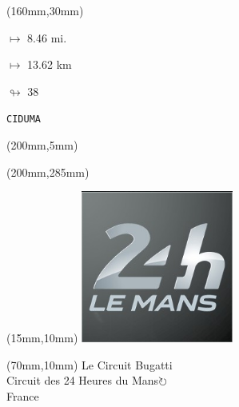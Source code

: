 \begin{textblock*}{40mm}(160mm,30mm)%
\Large
\par$\mapsto$ 8.46 mi.
\par$\mapsto$ 13.62 km
\par$\looparrowright$ 38
\par\hfill\tiny\tt CIDUMA\\
\end{textblock*}
\begin{textblock*}{20mm}(200mm,5mm)%
\fbox{\thepage}
\label{CIDUMA}
\end{textblock*}
\begin{textblock*}{20mm}(200mm,285mm)%
\fbox{\thepage}
\end{textblock*}

\null\newpage
\begin{textblock*}{50mm}(15mm,10mm)%
\includegraphics[width=50mm]{LG/2015-05-20_00084.png}
\end{textblock*}
\begin{textblock*}{130mm}(70mm,10mm)%
{\fontsize{20}{20}\selectfont Le Circuit Bugatti\\}
{\fontsize{16}{16}\selectfont Circuit des 24 Heures du Mans\hfill \Large$\circlearrowright$\\}
{\fontsize{12}{12}\selectfont France\\}
\end{textblock*}
